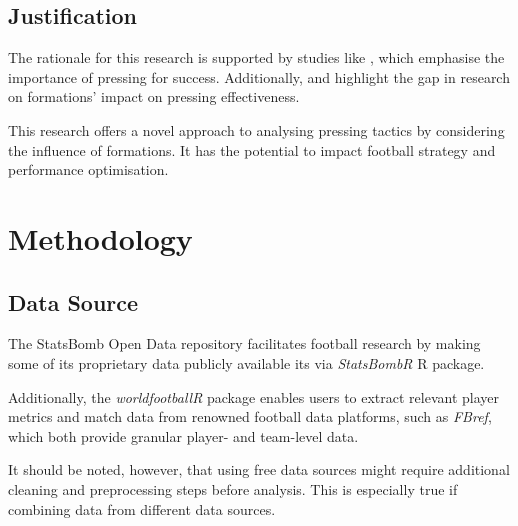 \documentclass[12pt]{article}
\begin{document}
\subsection{Justification}
The rationale for this research is supported by studies like \citet{modric_influence_2023}, which emphasise the importance of pressing for success. Additionally, \citet{rico-gonzalez_markel_machine_2023} and \citet{goes_unlocking_2021} highlight the gap in research on formations' impact on pressing effectiveness.

This research offers a novel approach to analysing pressing tactics by considering the influence of formations. It has the potential to impact football strategy and performance optimisation.

\section{Methodology}
\subsection{Data Source}
The StatsBomb Open Data repository facilitates football research by making some of its proprietary data publicly available its via \textit{StatsBombR} R package. 

Additionally, the \textit{worldfootballR} package enables users to extract relevant player metrics and match data from renowned football data platforms, such as \textit{FBref}, which both provide granular player- and team-level data. 

It should be noted, however, that using free data sources might require additional cleaning and preprocessing steps before analysis. This is especially true if combining data from different data sources.
\end{document}
